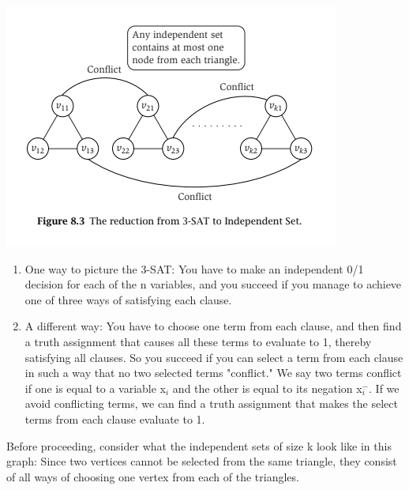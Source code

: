 \documentclass{article}
\begin{document}
\begin{center}
    \includegraphics[]{figures/fig26.png}
\end{center}

\begin{enumerate}
    \item One way to picture the 3-SAT: You have to make an independent 0/1 decision for each of the n variables, and you succeed if you manage to achieve one of three ways of satisfying each clause.
    \item A different way: You have to choose one term from each clause, and then find a truth assignment that causes all these terms to evaluate to 1, thereby satisfying all clauses. So you succeed if you can select a term from each clause in such a way that no two selected terms "conflict." We say two terms conflict if one is equal to a variable x$_i$ and the other is equal to its negation x$_{i}^{-}$. If we avoid conflicting terms, we can find a truth assignment that makes the select terms from each clause evaluate to 1.
\end{enumerate}

Before proceeding, consider what the independent sets of size k look like in this graph: Since two vertices cannot be selected from the same triangle, they consist of all ways of choosing one vertex from each of the triangles.\\
\end{document}
